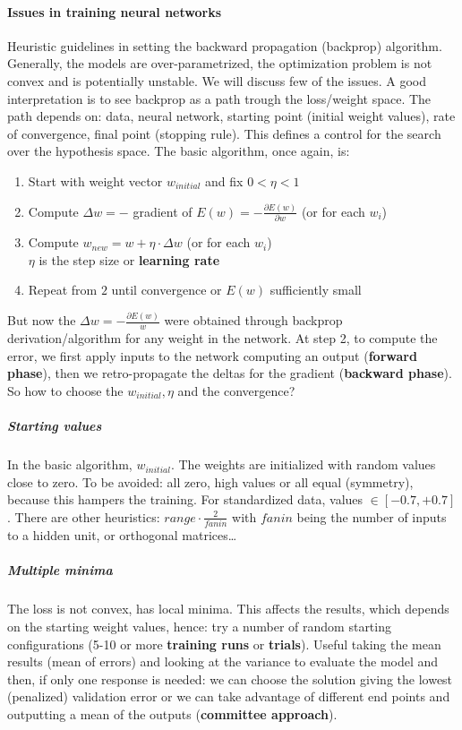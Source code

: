 \documentclass[10pt]{report}
\begin{document}
\paragraph{Issues in training neural networks} Heuristic guidelines in setting the backward propagation (backprop) algorithm. Generally, the models are over-parametrized, the optimization problem is not convex and is potentially unstable. We will discuss few of the issues. A good interpretation is to see backprop as a path trough the loss/weight space. The path depends on: data, neural network, starting point (initial weight values), rate of convergence, final point (stopping rule). This defines a control for the search over the hypothesis space. The basic algorithm, once again, is:
\begin{enumerate}
	\item Start with weight vector $w_{initial}$ and fix $0 < \eta < 1$
	\item Compute $\Delta w = -$ gradient of $E(w) = -\frac{\partial E(w)}{\partial w}$ (or for each $w_i$)
	\item Compute $w_{new} = w + \eta\cdot\Delta w$ (or for each $w_i$)\\
	$\eta$ is the step size or \textbf{learning rate}
	\item Repeat from $2$ until convergence or $E(w)$ sufficiently small
\end{enumerate}
But now the $\Delta w =-\frac{\partial E(w)}{w}$ were obtained through backprop derivation/algorithm for any weight in the network. At step 2, to compute the error, we first apply inputs to the network computing an output (\textbf{forward phase}), then we retro-propagate the deltas for the gradient (\textbf{backward phase}). So how to choose the $w_{initial}, \eta$ and the convergence?
\subparagraph{Starting values} In the basic algorithm, $w_{initial}$. The weights are initialized with random values close to zero. To be avoided: all zero, high values or all equal (symmetry), because this hampers the training. For standardized data, values $\in [-0.7, +0.7]$. There are other heuristics: $range \cdot \frac{2}{fanin}$ with $fanin$ being the number of inputs to a hidden unit, or orthogonal matrices\ldots
\subparagraph{Multiple minima} The loss is not convex, has local minima. This affects the results, which depends on the starting weight values, hence: try a number of random starting configurations (5-10 or more \textbf{training runs} or \textbf{trials}). Useful taking the mean results (mean of errors) and looking at the variance to evaluate the model and then, if only one response is needed: we can choose the solution giving the lowest (penalized) validation error or we can take advantage of different end points and outputting a mean of the outputs (\textbf{committee approach}).\\
\end{document}
